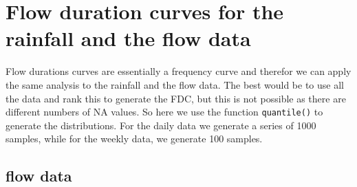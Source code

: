 \documentclass[]{article}
\begin{document}
\section{Flow duration curves for the rainfall and the flow
data}\label{flow-duration-curves-for-the-rainfall-and-the-flow-data}

Flow durations curves are essentially a frequency curve and therefor we
can apply the same analysis to the rainfall and the flow data. The best
would be to use all the data and rank this to generate the FDC, but this
is not possible as there are different numbers of NA values. So here we
use the function \texttt{quantile()} to generate the distributions. For
the daily data we generate a series of 1000 samples, while for the
weekly data, we generate 100 samples.

\subsection{flow data}\label{flow-data}
\end{document}
